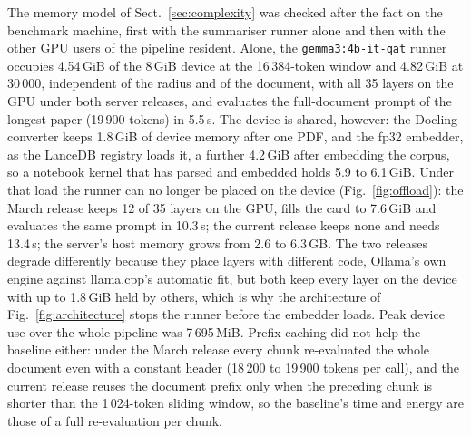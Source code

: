 \documentclass[pdflatex,sn-mathphys-num]{sn-jnl}
\newif\ifprovenance
\newcommand{\verify}[1]{\ifprovenance\textcolor{red}{{\footnotesize [VERIFY: #1]}}\fi}
\theoremstyle{thmstyleone}%
\theoremstyle{thmstylethree}%
\begin{document}
The memory model of Sect.~\ref{sec:complexity} was checked after the fact on the benchmark machine, first with the summariser runner alone and then with the other GPU users of the pipeline resident.\verify{all numbers of this subsection: \texttt{RnD/verification/ollama\_offload\_pressure\_*.json} (script \texttt{ollama\_offload\_under\_vram\_pressure.py}: longest $k=3$ prompt and full-document prompt of the longest paper, \texttt{num\_ctx} 30\,000 and 16\,384), \texttt{coresident\_gpu\_footprint.py}, \texttt{baseline\_prefix\_cache\_reuse.py}; measured 2026-10-05 with the installed Ollama 0.35.1 and with the 0.17.5 package that served the March runs, started from its extracted files on a second port; summary table in \texttt{RnD/verification/README.md}} Alone, the \texttt{gemma3:4b-it-qat} runner occupies 4.54\,GiB of the 8\,GiB device at the 16\,384-token window and 4.82\,GiB at 30\,000, independent of the radius and of the document, with all 35 layers on the GPU under both server releases, and evaluates the full-document prompt of the longest paper (19\,900 tokens) in 5.5\,s. The device is shared, however: the Docling converter keeps 1.8\,GiB of device memory after one PDF, and the fp32 embedder, as the LanceDB registry loads it, a further 4.2\,GiB after embedding the corpus, so a notebook kernel that has parsed and embedded holds 5.9 to 6.1\,GiB. Under that load the runner can no longer be placed on the device (Fig.~\ref{fig:offload}): the March release keeps 12 of 35 layers on the GPU, fills the card to 7.6\,GiB and evaluates the same prompt in 10.3\,s; the current release keeps none and needs 13.4\,s; the server's host memory grows from 2.6 to 6.3\,GB. The two releases degrade differently because they place layers with different code, Ollama's own engine against llama.cpp's automatic fit, but both keep every layer on the device with up to 1.8\,GiB held by others, which is why the architecture of Fig.~\ref{fig:architecture} stops the runner before the embedder loads. Peak device use over the whole pipeline was 7\,695\,MiB.\verify{\texttt{README.md} line~59} Prefix caching did not help the baseline either: under the March release every chunk re-evaluated the whole document even with a constant header (18\,200 to 19\,900 tokens per call), and the current release reuses the document prefix only when the preceding chunk is shorter than the 1\,024-token sliding window\verify{\texttt{baseline\_prefix\_cache\_reuse.py}: \texttt{prompt\_eval\_count} 19\,864 / 18\,201 / 18\,388 for chunks 0--2 of \texttt{s41586-019-1138-y} under 0.17.5 with either header; under 0.35.1 with a constant header chunk 2 took 0.1\,s instead of 5.1\,s}, so the baseline's time and energy are those of a full re-evaluation per chunk.
\end{document}
